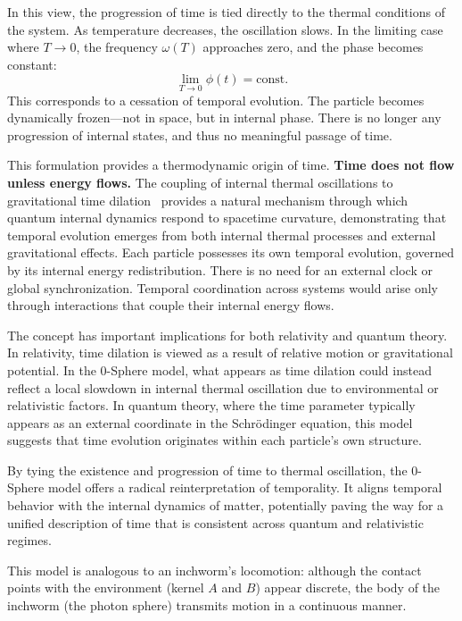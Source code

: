 \documentclass[%
 reprint,
 amsmath,amssymb,
 aps,
]{revtex4-1}
\numberwithin{equation}{section}%
\begin{document}
In this view, the progression of time is tied directly to the thermal conditions of the system. As temperature decreases, the oscillation slows. In the limiting case where $T \to 0$, the frequency $\omega(T)$ approaches zero, and the phase becomes constant:
\begin{equation} \label{eq:phase_freeze}
\lim_{T \to 0} \phi(t) = \text{const.}
\end{equation}
This corresponds to a cessation of temporal evolution. The particle becomes dynamically frozen—not in space, but in internal phase. There is no longer any progression of internal states, and thus no meaningful passage of time.

This formulation provides a thermodynamic origin of time. \textbf{Time does not flow unless energy flows.} The coupling of internal thermal oscillations to gravitational time dilation~\cite{hanamura2507.0033} provides a natural mechanism through which quantum internal dynamics respond to spacetime curvature, demonstrating that temporal evolution emerges from both internal thermal processes and external gravitational effects. Each particle possesses its own temporal evolution, governed by its internal energy redistribution. There is no need for an external clock or global synchronization. Temporal coordination across systems would arise only through interactions that couple their internal energy flows.

The concept has important implications for both relativity and quantum theory. In relativity, time dilation is viewed as a result of relative motion or gravitational potential. In the 0-Sphere model, what appears as time dilation could instead reflect a local slowdown in internal thermal oscillation due to environmental or relativistic factors. In quantum theory, where the time parameter typically appears as an external coordinate in the Schrödinger equation, this model suggests that time evolution originates within each particle’s own structure.

By tying the existence and progression of time to thermal oscillation, the 0-Sphere model offers a radical reinterpretation of temporality. It aligns temporal behavior with the internal dynamics of matter, potentially paving the way for a unified description of time that is consistent across quantum and relativistic regimes.

This model is analogous to an inchworm's locomotion: although the contact points with the environment (kernel $A$ and $B$) appear discrete, the body of the inchworm (the photon sphere) transmits motion in a continuous manner.
\end{document}
